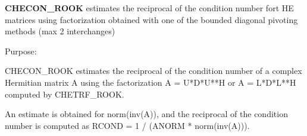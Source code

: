 {\bfseries C\+H\+E\+C\+O\+N\+\_\+\+R\+O\+O\+K} estimates the reciprocal of the condition number fort H\+E matrices using factorization obtained with one of the bounded diagonal pivoting methods (max 2 interchanges) 

 \begin{DoxyParagraph}{Purpose\+: }
\begin{DoxyVerb} CHECON_ROOK estimates the reciprocal of the condition number of a complex
 Hermitian matrix A using the factorization A = U*D*U**H or
 A = L*D*L**H computed by CHETRF_ROOK.

 An estimate is obtained for norm(inv(A)), and the reciprocal of the
 condition number is computed as RCOND = 1 / (ANORM * norm(inv(A))).\end{DoxyVerb}
 
\end{DoxyParagraph}


